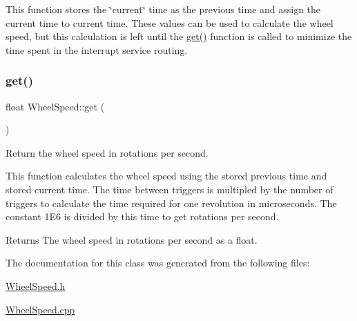 This function stores the \char`\"{}current\char`\"{} time as the previous time and assign the current time to current time. These values can be used to calculate the wheel speed, but this calculation is left until the \mbox{\hyperlink{class_wheel_speed_a1b830e36d556de4f9aa6c2a1e4100fd8}{get()}} function is called to minimize the time spent in the interrupt service routing. \mbox{\label{class_wheel_speed_a1b830e36d556de4f9aa6c2a1e4100fd8}} 
\subsubsection{\texorpdfstring{get()}{get()}}
{\footnotesize\ttfamily float Wheel\+Speed\+::get (\begin{DoxyParamCaption}{ }\end{DoxyParamCaption})}



Return the wheel speed in rotations per second. 

This function calculates the wheel speed using the stored previous time and stored current time. The time between triggers is multipled by the number of triggers to calculate the time required for one revolution in microseconds. The constant 1\+E6 is divided by this time to get rotations per second. \begin{DoxyReturn}{Returns}
The wheel speed in rotations per second as a float. 
\end{DoxyReturn}


The documentation for this class was generated from the following files\+:\begin{DoxyCompactItemize}
\item 
\mbox{\hyperlink{_wheel_speed_8h}{Wheel\+Speed.\+h}}\item 
\mbox{\hyperlink{_wheel_speed_8cpp}{Wheel\+Speed.\+cpp}}\end{DoxyCompactItemize}
